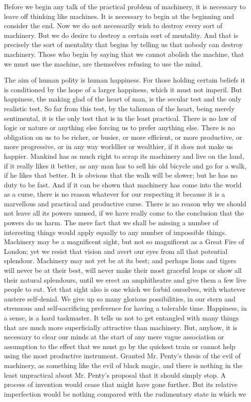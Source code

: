 \documentclass{book}
\begin{document}
Before we begin any talk of the practical problem of machinery, it is necessary to leave off thinking like machines. It is necessary to begin at the beginning and consider the end. Now we do not necessarily wish to destroy every sort of machinery. But we do desire to destroy a certain sort of mentality. And that is precisely the sort of mentality that begins by telling us that nobody can destroy machinery. Those who begin by saying that we cannot abolish the machine, that we must use the machine, are themselves refusing to use the mind.

The aim of human polity is human happiness. For those holding certain beliefs it is conditioned by the hope of a larger happiness, which it must not imperil. But happiness, the making glad of the heart of man, is the secular test and the only realistic test. So far from this test, by the talisman of the heart, being merely sentimental, it is the only test that is in the least practical. There is no law of logic or nature or anything else forcing us to prefer anything else. There is no obligation on us to be richer, or busier, or more efficient, or more productive, or more progressive, or in any way worldlier or wealthier, if it does not make us happier. Mankind has as much right to scrap its machinery and live on the land, if it really likes it better, as any man has to sell his old bicycle and go for a walk, if he likes that better. It is obvious that the walk will be slower; but he has no duty to be fast. And if it can be shown that machinery has come into the world as a curse, there is no reason whatever for our respecting it because it is a marvellous and practical and productive curse. There is no reason why we should not leave all its powers unused, if we have really come to the conclusion that the powers do us harm. The mere fact that we shall be missing a number of interesting things would apply equally to any number of impossible things. Machinery may be a magnificent sight, but not so magnificent as a Great Fire of London; yet we resist that vision and avert our eyes from all that potential splendour. Machinery may not yet be at its best; and perhaps lions and tigers will never be at their best, will never make their most graceful leaps or show all their natural splendours, until we erect an amphitheatre and give them a few live people to eat. Yet that sight also is one which we forbid ourselves, with whatever austere self-denial. We give up so many glorious possibilities, in our stern and strenuous and self-sacrificing preference for having a tolerable time. Happiness, in a sense, is a hard taskmaster. It tells us not to get entangled with many things that are much more superficially attractive than machinery. But, anyhow, it is necessary to clear our minds at the start of any mere vague association or assumption to the effect that we must go by the quickest train or cannot help using the most productive instrument. Granted Mr. Penty’s thesis of the evil of machinery, as something like the evil of black magic, and there is nothing in the least unpractical about Mr. Penty’s proposal that it should simply stop. A process of invention would cease that might have gone further. But its relative imperfection would be nothing compared with the rudimentary state in which we 
\end{document}

